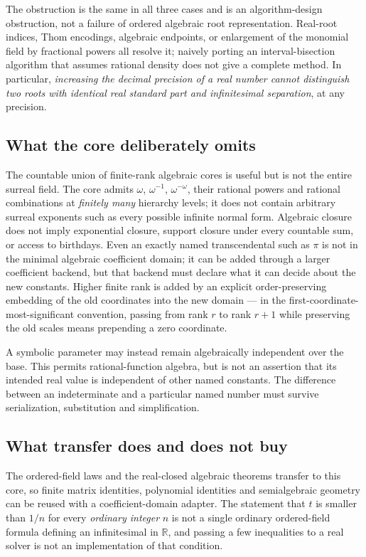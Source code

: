 \documentclass[11pt,letterpaper]{article}
\numberwithin{equation}{section}
\theoremstyle{definition}
\theoremstyle{remark}
\newcommand{\R}{\mathbb R}
\begin{document}
The obstruction is the same in all three cases and is an algorithm-design
obstruction, not a failure of ordered algebraic root representation. Real-root
indices, Thom encodings, algebraic endpoints, or enlargement of the monomial
field by fractional powers all resolve it; naively porting an
interval-bisection algorithm that assumes rational density does not give a
complete method. In particular, \emph{increasing the decimal precision of a real
number cannot distinguish two roots with identical real standard part and
infinitesimal separation}, at any precision.

\subsection{What the core deliberately omits}
\label{cas:sub-coreomits}
The countable union of finite-rank algebraic cores is useful but is not the
entire surreal field. The core admits $\omega$, $\omega^{-1}$,
$\omega^{-\omega}$, their rational powers and rational combinations at
\emph{finitely many} hierarchy levels; it does not contain arbitrary surreal
exponents such as every possible infinite normal form. Algebraic closure does
not imply exponential closure, support closure under every countable sum, or
access to birthdays. Even an exactly named transcendental such as $\pi$ is not
in the minimal algebraic coefficient domain; it can be added through a larger
coefficient backend, but that backend must declare what it can decide about the
new constants. Higher finite rank is added by an explicit order-preserving
embedding of the old coordinates into the new domain --- in the
first-coordinate-most-significant convention, passing from rank $r$ to rank
$r+1$ while preserving the old scales means prepending a zero coordinate.

A symbolic parameter may instead remain algebraically independent over the base.
This permits rational-function algebra, but is not an assertion that its
intended real value is independent of other named constants. The difference
between an indeterminate and a particular named number must survive
serialization, substitution and simplification.

\subsection{What transfer does and does not buy}
\label{cas:sub-transfer}
The ordered-field laws and the real-closed algebraic theorems transfer to this
core, so finite matrix identities, polynomial identities and semialgebraic
geometry can be reused with a coefficient-domain adapter. The statement that $t$
is smaller than $1/n$ for every \emph{ordinary integer} $n$ is not a single
ordinary ordered-field formula defining an infinitesimal in $\R$, and passing a
few inequalities to a real solver is not an implementation of that condition.
\end{document}
